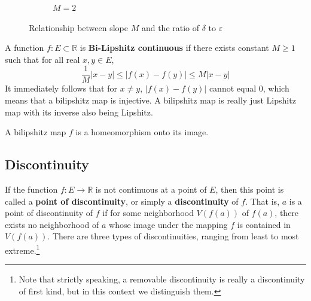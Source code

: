 \begin{figure}[H]
\begin{subfigure}[b]{0.32\textwidth}
      \caption{$M = 2$}
    \end{subfigure}
    \caption{Relationship between slope $M$ and the ratio of $\delta$ to $\varepsilon$}
    \label{fig:slope-epsilon-delta}
  \end{figure}

  \begin{definition}
    A function $f: E \subset \mathbb{R}$ is \textbf{Bi-Lipshitz continuous} if there exists constant $M\geq 1$ such that for all real $x, y \in E$, 
    \[ \frac{1}{M} |x - y| \leq |f(x) - f(y)| \leq M |x - y|\]
    It immediately follows that for $x \neq y$, $ |f(x) - f(y)|$ cannot equal $0$, which means that a bilipshitz map is injective. A bilipshitz map is really just Lipshitz map with its inverse also being Lipshitz. 
  \end{definition}

  \begin{proposition}
  A bilipshitz map $f$ is a homeomorphism onto its image. 
  \end{proposition}

\subsection{Discontinuity}

  If the function $f: E \longrightarrow \mathbb{R}$ is not continuous at a point of $E$, then this point is called a \textbf{point of discontinuity}, or simply a \textbf{discontinuity} of $f$. That is, $a$ is a point of discontinuity of $f$ if for some neighborhood $V(f(a))$ of $f(a)$, there exists no neighborhood of $a$ whose image under the mapping $f$ is contained in $V(f(a))$. There are three types of discontinuities, ranging from least to most extreme.\footnote{Note that strictly speaking, a removable discontinuity is really a discontinuity of first kind, but in this context we distinguish them. } 


